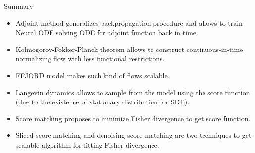 \begin{frame}{Summary}
	\begin{itemize}
		\item Adjoint method generalizes backpropagation procedure and allows to train Neural ODE solving ODE for adjoint function back in time.
		\vfill
		\item Kolmogorov-Fokker-Planck theorem allows to construct continuous-in-time normalizing flow with less functional restrictions.
		\vfill
		\item FFJORD model makes such kind of flows scalable.
		\vfill
		\item Langevin dynamics allows to sample from the model using the score function (due to the existence of stationary distribution for SDE).
		\vfill
		\item Score matching proposes to minimize Fisher divergence to get score function.
		\vfill
		\item Sliced score matching and denoising score matching are two techniques to get scalable algorithm for fitting Fisher divergence.
	\end{itemize}
\end{frame}
 